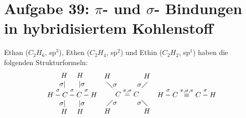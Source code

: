 \documentclass[a4paper,12pt]{article}
\begin{document}
\section*{Aufgabe 39: $\pi$- und $\sigma$- Bindungen in hybridisiertem Kohlenstoff}
Ethan ($C_2H_6$, sp${}^3$), Ethen ($C_2H_4$, sp${}^2$) und Ethin ($C_2H_2$, sp${}^1$) haben die folgenden Strukturformeln:
\begin{align*}
\begin{matrix}
 H\ \ \ \ H\\ \sigma\vert\ \ \ \ \ \, \vert\sigma\\
H\overset{\sigma}{-}C\overset{\sigma}{-}C\overset{\sigma}{-}H\\ \sigma\vert\ \ \ \ \ \, \vert\sigma\\
 H\ \ \ \ H
\end{matrix}&&\begin{matrix}
H\ \ \ \ \ \ \ \ \ \ \ \ \ \ H\\ \diagdown\sigma\ \ \ \ \ \ \ \ \, \sigma\diagup\\
C\overset{\pi,\sigma}{=}C\\ \diagup\sigma\ \ \ \ \ \ \ \ \, \sigma\diagdown\\
H\ \ \ \ \ \ \ \ \ \ \ \ \ \ H
\end{matrix}&&\begin{matrix}
H\overset{\sigma}{-}C\overset{\pi,\sigma,\pi}{\equiv} C\overset{\sigma}{-}H
\end{matrix}
\end{align*}
\end{document}
